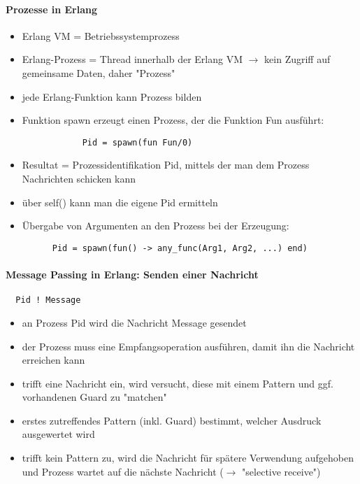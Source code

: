 \documentclass[10pt]{article}
\begin{document}
\paragraph{Prozesse in Erlang}
\begin{itemize}
  \item Erlang VM = Betriebssystemprozess
  \item Erlang-Prozess = Thread innerhalb der Erlang VM $\rightarrow$ kein Zugriff auf gemeinsame Daten, daher "Prozess"
  \item jede Erlang-Funktion kann Prozess bilden
  \item Funktion spawn erzeugt einen Prozess, der die Funktion Fun ausführt:
        \begin{lstlisting}
            Pid = spawn(fun Fun/0)
          \end{lstlisting}
  \item Resultat = Prozessidentifikation Pid, mittels der man dem Prozess Nachrichten schicken kann
  \item über self() kann man die eigene Pid ermitteln
  \item Übergabe von Argumenten an den Prozess bei der Erzeugung:
        \begin{lstlisting}
      Pid = spawn(fun() -> any_func(Arg1, Arg2, ...) end)
    \end{lstlisting}
\end{itemize}

\paragraph{Message Passing in Erlang: Senden einer Nachricht}
\begin{lstlisting}
  Pid ! Message
\end{lstlisting}
\begin{itemize}
  \item an Prozess Pid wird die Nachricht Message gesendet
  \item der Prozess muss eine Empfangsoperation ausführen, damit ihn die Nachricht erreichen kann
  \item trifft eine Nachricht ein, wird versucht, diese mit einem Pattern und ggf. vorhandenen Guard zu "matchen"
  \item erstes zutreffendes Pattern (inkl. Guard) bestimmt, welcher Ausdruck ausgewertet wird
  \item trifft kein Pattern zu, wird die Nachricht für spätere Verwendung aufgehoben und Prozess wartet auf die nächste Nachricht ($\rightarrow$ "selective receive")
\end{itemize}
\end{document}
